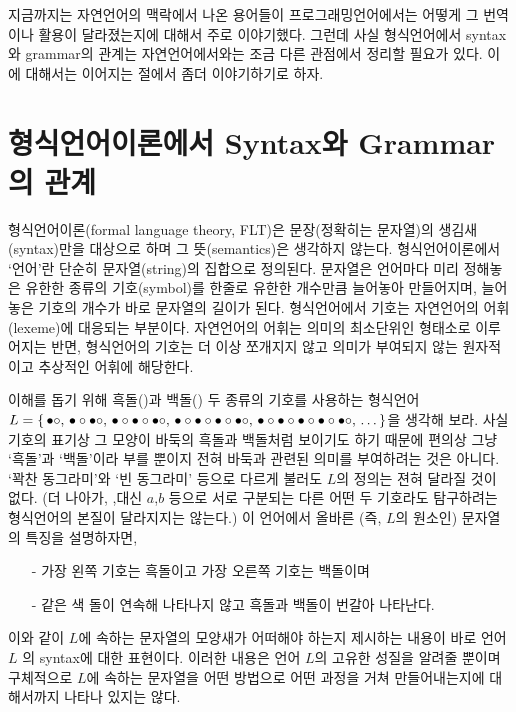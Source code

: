 지금까지는 자연언어의 맥락에서 나온 용어들이 프로그래밍언어에서는 어떻게
그 번역이나 활용이 달라졌는지에 대해서 주로 이야기했다. 그런데 사실
형식언어에서 syntax와 grammar의 관계는 자연언어에서와는 조금 다른 관점에서
정리할 필요가 있다. 이에 대해서는 이어지는 절에서 좀더 이야기하기로 하자.

\section{형식언어이론에서 Syntax와 Grammar의 관계}
\label{sec:FormalLangSG}
형식언어이론(formal language theory, FLT)은 문장(정확히는 문자열)의 생김새(syntax)만을
대상으로 하며 그 뜻(semantics)은 생각하지 않는다. 형식언어이론에서 `언어'란 단순히
문자열(string)의 집합으로 정의된다. 문자열은 언어마다 미리 정해놓은 유한한 종류의
기호(symbol)를 한줄로 유한한 개수만큼 늘어놓아 만들어지며, 늘어놓은 기호의 개수가
바로 문자열의 길이가 된다. 형식언어에서 기호는 자연언어의 어휘(lexeme)에 대응되는 부분이다.
자연언어의 어휘는 의미의 최소단위인 형태소로 이루어지는 반면,
형식언어의 기호는 더 이상 쪼개지지 않고 의미가 부여되지 않는
원자적이고 추상적인 어휘에 해당한다.

이해를 돕기 위해 흑돌(\txtbullet)과 백돌(\txtcircle) 두 종류의 기호를 사용하는 형식언어
$L = \{\, \bullet\circ
      ,\, \bullet\circ\bullet\circ
      ,\, \bullet\circ\bullet\circ\bullet\circ
      ,\, \bullet\circ\bullet\circ\bullet\circ\bullet\circ
      ,\, \bullet\circ\bullet\circ\bullet\circ\bullet\circ\bullet\circ
      ,\, \ldots
   \,\}$을 생각해 보라.
사실 기호의 표기상 그 모양이 바둑의 흑돌과 백돌처럼 보이기도 하기 때문에
편의상 그냥 `흑돌'과 `백돌'이라 부를 뿐이지 전혀 바둑과 관련된 의미를
부여하려는 것은 아니다. `꽉찬 동그라미'와 `빈 동그라미' 등으로 다르게
불러도 $L$의 정의는 젼혀 달라질 것이 없다. (더 나아가,
\txtbullet,\txtcircle 대신 $a$,$b$ 등으로 서로 구분되는
다른 어떤 두 기호라도 탐구하려는 형식언어의 본질이 달라지지는 않는다.)
이 언어에서 올바른 (즉, $L$의 원소인) 문자열의 특징을 설명하자면,\vspace{-1ex}
\begin{itemize}\tightlist
    \item[-] 가장 왼쪽 기호는 흑돌이고 가장 오른쪽 기호는 백돌이며
    \item[-] 같은 색 돌이 연속해 나타나지 않고 흑돌과 백돌이 번갈아 나타난다.
\end{itemize}
이와 같이 $L$에 속하는 문자열의 모양새가 어떠해야 하는지 제시하는 내용이
바로 언어 $L$ 의 syntax에 대한 표현이다. 이러한 내용은 언어 $L$의 고유한
성질을 알려줄 뿐이며 구체적으로 $L$에 속하는 문자열을 어떤 방법으로 어떤
과정을 거쳐 만들어내는지에 대해서까지 나타나 있지는 않다.

